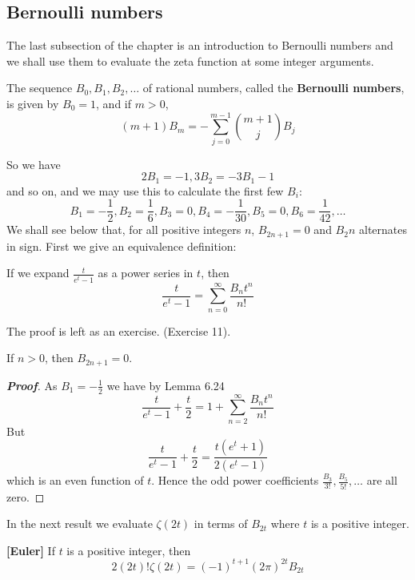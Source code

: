 \subsection{Bernoulli numbers}
The last subsection of the chapter is an introduction to Bernoulli numbers and we shall use them to
evaluate the zeta function at some integer arguments.
\begin{definition} The sequence $B_0,B_1,B_2,\ldots$ of rational numbers, called the {\bf Bernoulli numbers}, is given by $B_0=1$, and if $m>0$,
$$(m+1)B_m=-\sum_{j=0}^{m-1}\binom{m+1}{j}B_j$$
\end{definition}
So we have
$$2B_1=-1, 3B_2=-3B_1-1$$ and so on, and we may use this to calculate the first few $B_i$:
$$B_1=-\frac{1}{2},B_2=\frac{1}{6},B_3=0,B_4=-\frac{1}{30},B_5=0,B_6=\frac{1}{42},\ldots$$
We shall see below that, for all positive integers $n$, $B_{2n+1}=0$ and $B_2n$ alternates in sign. First we give an equivalence definition:
\begin{lemma} If we expand $\frac{t}{e^t-1}$ as a power series in $t$, then
$$\frac{t}{e^t-1}=\sum_{n=0}^\infty \frac{B_nt^n}{n!}$$
\end{lemma}
The proof is left as an exercise. (Exercise 11).
\begin{corollary} If $n>0$, then $B_{2n+1}=0$.
\end{corollary}
\begin{proof}[\bf Proof] As $B_1 =-\frac{1}{2}$ we have by Lemma 6.24
$$\frac{t}{e^t-1}+\frac{t}{2}=1+\sum_{n=2}^\infty \frac{B_nt^n}{n!}$$
But
$$\frac{t}{e^t-1}+\frac{t}{2}=\frac{t(e^t+1)}{2(e^t-1)}$$
which is an even function of $t$. Hence the odd power coefficients $\frac{B_3}{3!},\frac{B_5}{5!},\ldots$
are all zero.
\end{proof}
In the next result we evaluate $\zeta(2t)$ in terms of $B_{2t}$ where $t$ is a positive integer.
\begin{theorem}{\bf [Euler]}\label{E;Euler, zeta} If $t$ is a positive integer, then
$$2(2t)!\zeta(2t)=(-1)^{t+1}(2\pi)^{2t}B_{2t}$$
\end{theorem}

